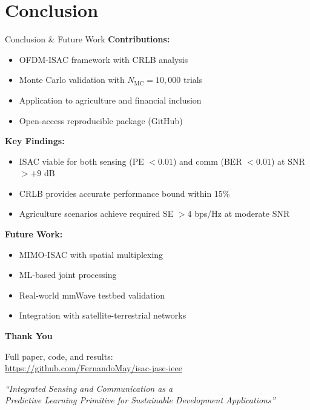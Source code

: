 \documentclass[11pt,aspectratio=169]{beamer}
\begin{document}
\section{Conclusion}

\begin{frame}{Conclusion \& Future Work}
\textbf{Contributions:}
\begin{itemize}
    \item OFDM-ISAC framework with CRLB analysis
    \item Monte Carlo validation with $N_{\text{MC}} = 10{,}000$ trials
    \item Application to agriculture and financial inclusion
    \item Open-access reproducible package (GitHub)
\end{itemize}

\vspace{0.5em}
\textbf{Key Findings:}
\begin{itemize}
    \item ISAC viable for both sensing (PE $<0.01$) and comm (BER $<0.01$) at SNR $>+9$ dB
    \item CRLB provides accurate performance bound within 15\%
    \item Agriculture scenarios achieve required SE $>4$ bps/Hz at moderate SNR
\end{itemize}

\vspace{0.5em}
\textbf{Future Work:}
\begin{itemize}
    \item MIMO-ISAC with spatial multiplexing
    \item ML-based joint processing
    \item Real-world mmWave testbed validation
    \item Integration with satellite-terrestrial networks
\end{itemize}
\end{frame}

\begin{frame}
\centering
\vspace{2em}
{\LARGE \textbf{Thank You}}
\vspace{2em}

Full paper, code, and results:\\
\url{https://github.com/FernandoMay/isac-jasc-ieee}

\vspace{1em}
\textit{``Integrated Sensing and Communication as a\\Predictive Learning Primitive for Sustainable Development Applications''}
\end{frame}
\end{document}
